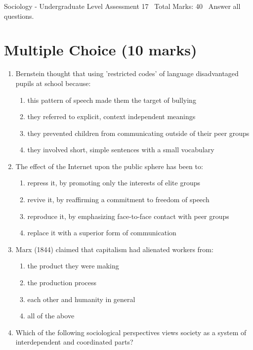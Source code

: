 \documentclass[12pt]{article}
\begin{document}
\begin{center}
Sociology - Undergraduate Level Assessment 17 \
Total Marks: 40 \
Answer all questions.
\end{center}

\section*{Multiple Choice (10 marks)}
\begin{enumerate}[label=\arabic*.]
\item Bernstein thought that using 'restricted codes' of language disadvantaged pupils at school because:
\begin{enumerate}[label=(\alph*)]
    \item this pattern of speech made them the target of bullying
    \item they referred to explicit, context independent meanings
    \item they prevented children from communicating outside of their peer groups
    \item they involved short, simple sentences with a small vocabulary
\end{enumerate}
\item The effect of the Internet upon the public sphere has been to:
\begin{enumerate}[label=(\alph*)]
    \item repress it, by promoting only the interests of elite groups
    \item revive it, by reaffirming a commitment to freedom of speech
    \item reproduce it, by emphasizing face-to-face contact with peer groups
    \item replace it with a superior form of communication
\end{enumerate}
\item Marx (1844) claimed that capitalism had alienated workers from:
\begin{enumerate}[label=(\alph*)]
    \item the product they were making
    \item the production process
    \item each other and humanity in general
    \item all of the above
\end{enumerate}
\item Which of the following sociological perspectives views society as a system of interdependent and coordinated parts?

\end{enumerate}
\end{document}
